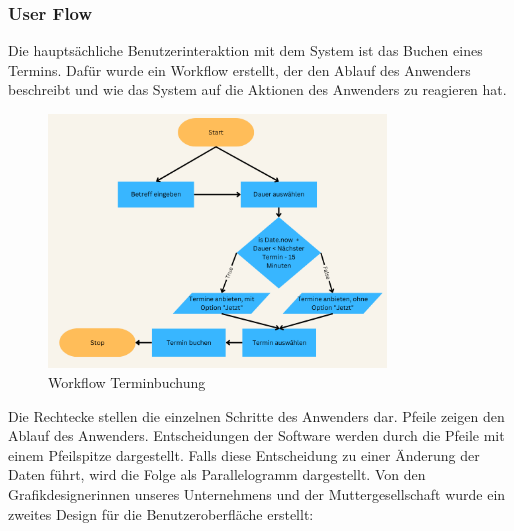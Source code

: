 \subsubsection{User Flow}\label{subsubsec:user-flow}
Die hauptsächliche Benutzerinteraktion mit dem System ist das Buchen eines Termins.
Dafür wurde ein Workflow erstellt, der den Ablauf des Anwenders beschreibt und wie das System auf die Aktionen des Anwenders zu reagieren hat.
\begin{figure}[h]
\par\vspace{1cm}
\centering
\includegraphics[width=0.8\textwidth]{Bilder/Workflow Terminbuchung}
\caption{Workflow Terminbuchung}
\label{fig:Workflow Terminbuchung}
\par\vspace{1cm}
\end{figure}
\justifying
\newline
Die Rechtecke stellen die einzelnen Schritte des Anwenders dar.
Pfeile zeigen den Ablauf des Anwenders.
Entscheidungen der Software werden durch die Pfeile mit einem Pfeilspitze dargestellt.
Falls diese Entscheidung zu einer Änderung der Daten führt, wird die Folge als Parallelogramm dargestellt.
\newline
\newline
Von den Grafikdesignerinnen unseres Unternehmens und der Muttergesellschaft wurde ein zweites Design für die Benutzeroberfläche erstellt:

